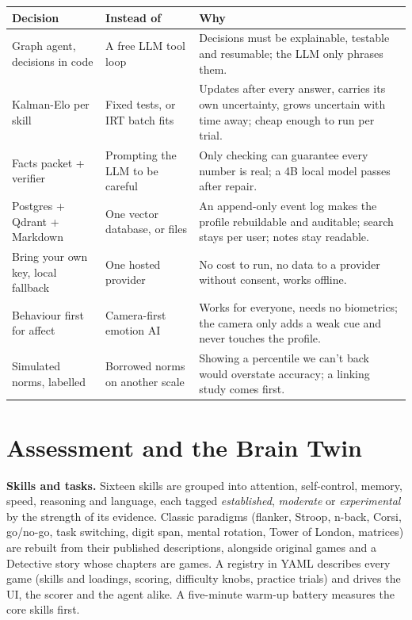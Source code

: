 \documentclass[10pt,a4paper]{article}
\begin{document}
\begin{table}[h]
\centering\small
\begin{tabular}{@{}p{3.6cm}p{3.6cm}p{9cm}@{}}
\toprule
Decision & Instead of & Why \\
\midrule
Graph agent, decisions in code & A free LLM tool loop & Decisions must be explainable, testable and resumable; the LLM only phrases them. \\
Kalman-Elo per skill & Fixed tests, or IRT batch fits & Updates after every answer, carries its own uncertainty, grows uncertain with time away; cheap enough to run per trial. \\
Facts packet + verifier & Prompting the LLM to be careful & Only checking can guarantee every number is real; a 4B local model passes after repair. \\
Postgres + Qdrant + Markdown & One vector database, or files & An append-only event log makes the profile rebuildable and auditable; search stays per user; notes stay readable. \\
Bring your own key, local fallback & One hosted provider & No cost to run, no data to a provider without consent, works offline. \\
Behaviour first for affect & Camera-first emotion AI & Works for everyone, needs no biometrics; the camera only adds a weak cue and never touches the profile. \\
Simulated norms, labelled & Borrowed norms on another scale & Showing a percentile we can't back would overstate accuracy; a linking study comes first. \\
\bottomrule
\end{tabular}
\end{table}

\section{Assessment and the Brain Twin}
\textbf{Skills and tasks.} Sixteen skills are grouped into attention, self-control, memory, speed,
reasoning and language, each tagged \emph{established}, \emph{moderate} or \emph{experimental} by the
strength of its evidence. Classic paradigms (flanker, Stroop, n-back, Corsi, go/no-go, task
switching, digit span, mental rotation, Tower of London, matrices) are rebuilt from their published
descriptions, alongside original games and a Detective story whose chapters are games. A registry in
YAML describes every game (skills and loadings, scoring, difficulty knobs, practice trials) and drives
the UI, the scorer and the agent alike. A five-minute warm-up battery measures the core skills first.
\end{document}
